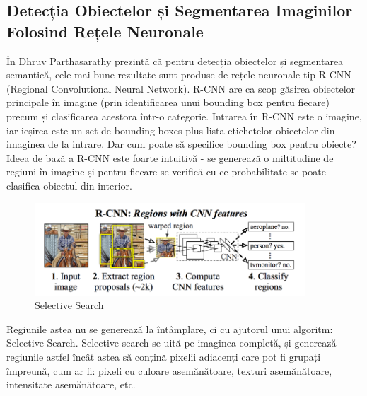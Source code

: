 \subsection{Detecția Obiectelor și Segmentarea Imaginilor Folosind Rețele Neuronale}
În \cite{historyCNN} Dhruv Parthasarathy prezintă că pentru detecția obiectelor și segmentarea semantică, cele mai bune rezultate sunt produse de rețele neuronale tip R-CNN (Regional Convolutional Neural Network). R-CNN are ca scop găsirea obiectelor principale în imagine (prin identificarea unui bounding box pentru fiecare) precum și clasificarea acestora într-o categorie. Intrarea în R-CNN este o imagine, iar ieșirea este un set de bounding boxes plus lista etichetelor obiectelor din imaginea de la intrare. Dar cum poate să specifice bounding box pentru obiecte? Ideea de bază a R-CNN este foarte intuitivă - se generează o miltitudine de regiuni în imagine și pentru fiecare se verifică cu ce probabilitate se poate clasifica obiectul din interior.\newline
\begin{figure}[h!]
    	\centering
	\captionsetup{justification=centering, margin=2cm}
	\includegraphics[width=0.9\textwidth]{figures/selective_search.png}
	\caption{Selective Search \cite{selective_search}}
	\label{fig:selective_search}
\end{figure}
Regiunile astea nu se generează la întâmplare, ci cu ajutorul unui algoritm: Selective Search. Selective search se uită pe imaginea completă, și generează regiunile astfel încât astea să conțină pixelii adiacenți care pot fi grupați împreună, cum ar fi: pixeli cu culoare asemănătoare, texturi asemănătoare, intensitate asemănătoare, etc.\newline

